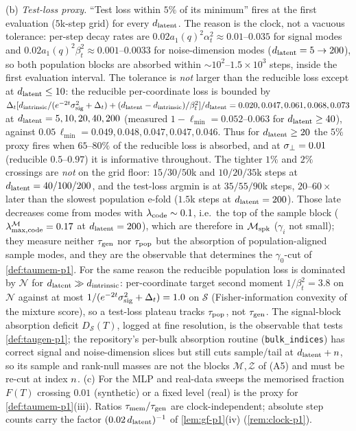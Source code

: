\begin{remark}
(b) \emph{Test-loss proxy.} ``Test loss within $5\%$ of its minimum'' fires at the first evaluation ($5$k-step grid) for every $d_{\mathrm{latent}}$. The reason is the clock, not a vacuous tolerance: per-step decay rates are $0.02a_1(q)^2\alpha_t^2\approx0.01$--$0.035$ for signal modes and $0.02a_1(q)^2\beta_t^2\approx0.001$--$0.0033$ for noise-dimension modes ($d_{\mathrm{latent}}=5\to200$), so both population blocks are absorbed within $\sim10^2$--$1.5\times10^3$ steps, inside the first evaluation interval. The tolerance is \emph{not} larger than the reducible loss except at $d_{\mathrm{latent}}\le10$: the reducible per-coordinate loss is bounded by $\Delta_t[d_{\mathrm{intrinsic}}/(e^{-2t}\sigma_{\mathrm{sig}}^2+\Delta_t)+(d_{\mathrm{latent}}-d_{\mathrm{intrinsic}})/\beta_t^2]/d_{\mathrm{latent}}=0.020,0.047,0.061,0.068,0.073$ at $d_{\mathrm{latent}}=5,10,20,40,200$ (measured $1-\ell_{\min}=0.052$--$0.063$ for $d_{\mathrm{latent}}\ge40$), against $0.05\,\ell_{\min}=0.049,0.048,0.047,0.047,0.046$. Thus for $d_{\mathrm{latent}}\ge20$ the $5\%$ proxy fires when $65$--$80\%$ of the reducible loss is absorbed, and at $\sigma_{\perp}=0.01$ (reducible $0.5$--$0.97$) it is informative throughout. The tighter $1\%$ and $2\%$ crossings are \emph{not} on the grid floor: $15/30/50$k and $10/20/35$k steps at $d_{\mathrm{latent}}=40/100/200$, and the test-loss argmin is at $35/55/90$k steps, $20$--$60\times$ later than the slowest population e-fold ($1.5$k steps at $d_{\mathrm{latent}}=200$). Those late decreases come from modes with $\lambda_{\rm code}\sim0.1$, i.e.\ the top of the sample block ($\lambda^{\mathcal M}_{\max,\rm code}=0.17$ at $d_{\mathrm{latent}}=200$), which are therefore in $\mathcal M_{\rm spk}$ ($\gamma_i$ not small); they measure neither $\tau_{\mathrm{gen}}$ nor $\tau_{\rm pop}$ but the absorption of population-aligned sample modes, and they are the observable that determines the $\gamma_0$-cut of \cref{def:taumem-p1}. For the same reason the reducible population loss is dominated by $\mathcal N$ for $d_{\mathrm{latent}}\gg d_{\mathrm{intrinsic}}$: per-coordinate target second moment $1/\beta_t^2=3.8$ on $\mathcal N$ against at most $1/(e^{-2t}\sigma_{\mathrm{sig}}^2+\Delta_t)=1.0$ on $\mathcal S$ (Fisher-information convexity of the mixture score), so a test-loss plateau tracks $\tau_{\rm pop}$, not $\tau_{\mathrm{gen}}$. The signal-block absorption deficit $D_{\mathcal S}(T)$, logged at fine resolution, is the observable that tests \cref{def:taugen-p1}; the repository's per-bulk absorption routine (\texttt{bulk\_indices}) has correct signal and noise-dimension slices but still cuts sample/tail at $d_{\mathrm{latent}}+n$, so its sample and rank-null masses are not the blocks $\mathcal M,\mathcal Z$ of (A5) and must be re-cut at index $n$.
(c) For the MLP and real-data sweeps the memorised fraction $F(T)$ crossing $0.01$ (synthetic) or a fixed level (real) is the proxy for \cref{def:taumem-p1}(iii). Ratios $\tau_{\mathrm{mem}}/\tau_{\mathrm{gen}}$ are clock-independent; absolute step counts carry the factor $(0.02\,d_{\mathrm{latent}})^{-1}$ of \cref{lem:gf-p1}(iv) (\cref{rem:clock-p1}).
\end{remark}


